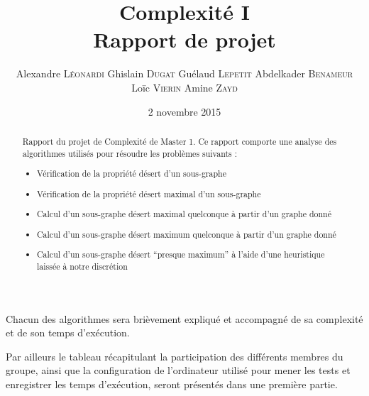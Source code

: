 \documentclass[a4paper,11pt]{article}
\title{
	\textbf{Complexité I}\\
	Rapport de projet
}
\author{
	\begin{minipage}{0.75\textwidth}
		Alexandre \textsc{Léonardi}
		Ghislain \textsc{Dugat}
		Guélaud \textsc{Lepetit}
		Abdelkader \textsc{Benameur}
		Loïc \textsc{Vierin}
		Amine \textsc{Zayd}
	\end{minipage}
}
\date{2 novembre 2015}
\begin{document}
	\maketitle
	\begin{abstract}
		Rapport du projet de Complexité de Master 1. Ce rapport comporte une analyse des algorithmes utilisés pour résoudre les problèmes suivants :
		\begin{itemize}[label=$\bullet$]
			\item Vérification de la propriété \og désert \fg{} d'un sous-graphe
			\item Vérification de la propriété \og désert maximal \fg{} d'un sous-graphe
			\item Calcul d'un sous-graphe désert maximal quelconque à partir d'un graphe donné
			\item Calcul d'un sous-graphe désert maximum quelconque à partir d'un graphe donné
			\item Calcul d'un sous-graphe désert "`presque maximum"' à l'aide d'une heuristique laissée à notre discrétion
		\end{itemize}
	\end{abstract}
	Chacun des algorithmes sera brièvement expliqué et accompagné de sa complexité et de son temps d'exécution. 
	
	Par ailleurs le tableau récapitulant la participation des différents membres du groupe, ainsi que la configuration de l'ordinateur utilisé pour mener les tests et enregistrer les temps d'exécution, seront présentés dans une première partie. 
	\vfill

\pagebreak
\tableofcontents
\pagebreak


\pagebreak

\pagebreak

\pagebreak

\pagebreak

\pagebreak
\end{document}
